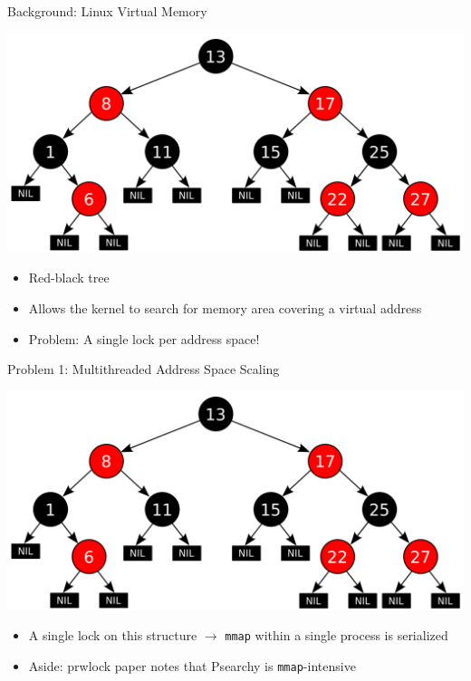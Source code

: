 \documentclass[aspectratio=169]{beamer}
\newcommand{\bi}{\begin{itemize}}
\newcommand{\ei}{\end{itemize}}
\begin{document}
\begin{frame}{Background: Linux Virtual Memory}
  \begin{center}
    \includegraphics[scale=0.2]{./figures/Red-black_tree.png}
  \end{center}
    \bi
    \item Red-black tree
    \item Allows the kernel to search for memory area covering a virtual address
      \pause
    \item {\color{red}Problem: A single lock per address space!}
    \ei
\end{frame}

\begin{frame}{Problem 1: Multithreaded Address Space Scaling}
  \begin{center}
    \includegraphics[scale=0.2]{./figures/Red-black_tree.png}
  \end{center}
    \bi
  \item {\color{red}A single lock on this structure} $\rightarrow$ \texttt{mmap} within a single process is serialized
    \pause
    \item Aside: prwlock paper notes that Psearchy is \texttt{mmap}-intensive
    \ei
\end{frame}
\end{document}
